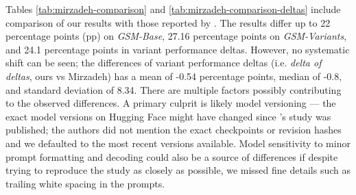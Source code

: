 \documentclass[11pt]{article}
\begin{document}
\newpage

Tables \ref{tab:mirzadeh-comparison} and \ref{tab:mirzadeh-comparison-deltas} include comparison of our results with those reported by \citet{mirzadeh2025gsm}. The results differ up to 22 percentage points (pp) on \textit{GSM-Base}, 27.16 percentage points on \textit{GSM-Variants}, and 24.1 percentage points in variant performance deltas. However, no systematic shift can be seen; the differences of variant performance deltas (i.e. \textit{delta of deltas}, ours vs Mirzadeh) has a mean of -0.54 percentage points, median of -0.8, and standard deviation of 8.34. There are multiple factors possibly contributing to the observed differences. A primary culprit is likely model versioning --- the exact model versions on Hugging Face might have changed since \citeauthor{mirzadeh2025gsm}'s study was published; the authors did not mention the exact checkpoints or revision hashes and we defaulted to the most recent versions available. Model sensitivity to minor prompt formatting and decoding could also be a source of differences if despite trying to reproduce the study as closely as possible, we missed fine details such as trailing white spacing in the prompts.
\end{document}
